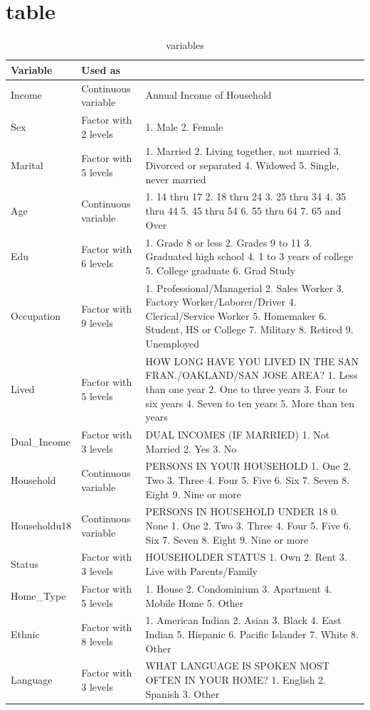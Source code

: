 \documentclass[11pt]{article}
\title{}
\author{}
\date{}
\begin{document}
\maketitle

\section{ table}

\begin{table}[H]
\centering
\begin{tabular}{|l|l|l|}
\hline
\textbf{Variable} &\textbf{Used as}\\
\hline
Income       &Continuous variable	&Annual Income of Household  \\
Sex          &Factor with 2 levels	&1. Male 2. Female\\
Marital      &Factor with 5 levels	&1. Married 2. Living together, not married 3. Divorced or separated 4. Widowed 5. Single, never married\\
Age          &Continuous variable	&1. 14 thru 17 2. 18 thru 24 3. 25 thru 34 4. 35 thru 44 5. 45 thru 54 6. 55 thru 64 7. 65 and Over\\
Edu          &Factor with 6 levels	&1. Grade 8 or less 2. Grades 9 to 11 3. Graduated high school 4. 1 to 3 years of college 5. College graduate 6. Grad Study\\
Occupation   &Factor with 9 levels	&1. Professional/Managerial 2. Sales Worker 3. Factory Worker/Laborer/Driver 4. Clerical/Service Worker 5. Homemaker 6. Student, HS or College 7. Military 8. Retired 9. Unemployed\\
Lived        &Factor with 5 levels	&HOW LONG HAVE YOU LIVED IN THE SAN FRAN./OAKLAND/SAN JOSE AREA? 1. Less than one year 2. One to three years 3. Four to six years 4. Seven to ten years 5. More than ten years\\
Dual\_Income &Factor with 3 levels	&DUAL INCOMES (IF MARRIED) 1. Not Married 2. Yes 3. No\\
Household    &Continuous variable	&PERSONS IN YOUR HOUSEHOLD 1. One 2. Two 3. Three 4. Four 5. Five 6. Six 7. Seven 8. Eight 9. Nine or more\\
Householdu18 &Continuous variable	&PERSONS IN HOUSEHOLD UNDER 18 0. None 1. One 2. Two 3. Three 4. Four 5. Five 6. Six 7. Seven 8. Eight 9. Nine or more\\
Status       &Factor with 3 levels	&HOUSEHOLDER STATUS 1. Own 2. Rent 3. Live with Parents/Family\\
Home\_Type   &Factor with 5 levels	&1. House 2. Condominium 3. Apartment 4. Mobile Home 5. Other\\
Ethnic       &Factor with 8 levels	&1. American Indian 2. Asian 3. Black 4. East Indian 5. Hispanic 6. Pacific Islander 7. White 8. Other\\
Language     &Factor with 3 levels	&WHAT LANGUAGE IS SPOKEN MOST OFTEN IN YOUR HOME? 1. English 2. Spanish 3. Other\\
\hline
\end{tabular}
\caption{variables}
\label{variables}
\end{table}
\end{document}

